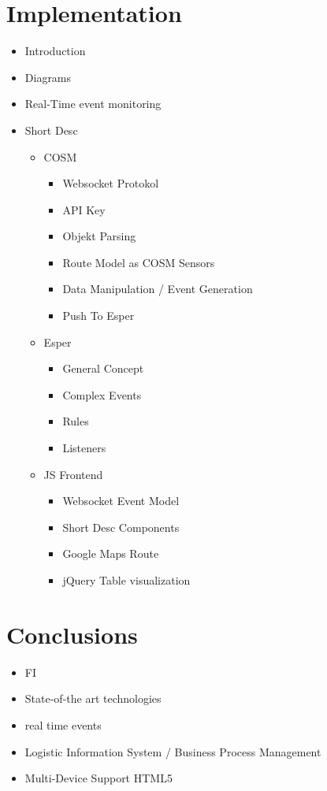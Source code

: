 \documentclass{acm_proc_article-sp}
\begin{document}
\section{Implementation}
\begin{itemize}
	\item Introduction
	\item Diagrams
	\item Real-Time event monitoring
	\item Short Desc
	\begin{itemize}
		\item COSM
		\begin{itemize}
			\item Websocket Protokol
			\item API Key
			\item Objekt Parsing
			\item Route Model as COSM Sensors
			\item Data Manipulation / Event Generation
			\item Push To Esper
		\end{itemize}
		\item Esper
		\begin{itemize}
			\item General Concept
			\item Complex Events
			\item Rules
			\item Listeners
		\end{itemize}
		\item JS Frontend
		\begin{itemize}
			\item Websocket Event Model
			\item Short Desc Components
			\item Google Maps Route
			\item jQuery Table visualization
		\end{itemize}
	\end{itemize}
\end{itemize}


\section{Conclusions}
\begin{itemize}
	\item FI
	\item State-of-the art technologies
	\item real time events
	\item Logistic Information System / Business Process Management
	\item Multi-Device Support HTML5
\end{itemize}
\end{document}

